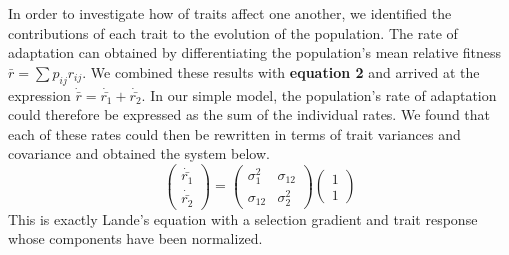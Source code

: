 \documentclass[9pt,twocolumn,twoside]{gsajnl}
\begin{document}
In order to investigate how of traits affect one another, we identified the contributions of each trait to the evolution of the population. The rate of adaptation can obtained by differentiating the population's mean relative fitness $\bar{r}=\sum p_{ij} r_{ij} $.  We combined these results with \textbf{equation 2} and arrived at the expression $\dot{\bar{r}}=\dot{\bar{r_1}} +\dot{\bar{r_2}}$.  In our simple model, the population's rate of adaptation could therefore be expressed as the sum of the individual rates. We found that each of these rates could then be rewritten in terms of trait variances and covariance and obtained the system below. 
% 
% 
% 
% 
\begin{equation}
\left(
\begin{array}{c}
\dot{\bar{r_1}} \\
\dot{\bar{r_2}} 
\end{array}
\right)
=
\left(
\begin{array}{cc}
\sigma_1^2 & \sigma_{12} \\
\sigma_{12} & \sigma_2^2 
\end{array}
\right)
\left(
\begin{array}{c}
1 \\
1 
\end{array}
\right)
\end{equation}
This is exactly Lande's equation with a selection gradient and trait response whose components have been normalized.  
\end{document}
